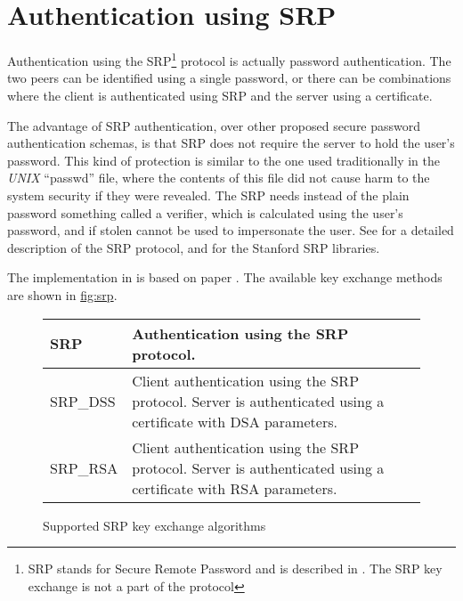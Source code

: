 \section{Authentication using SRP}

Authentication using the SRP\footnote{SRP stands for Secure Remote Password and 
is described in \cite{RFC2945}. The SRP key exchange is not a part of the \tlsI{} protocol}
protocol is actually password authentication. The two peers can be identified using a
single password, or there can be combinations where the client is 
authenticated using SRP and the server using a certificate.
\par
The advantage of SRP authentication, over other proposed secure password 
authentication schemas, is that SRP does not require the server to hold
the user's password. This kind of protection is similar to the one used traditionally
in the \emph{UNIX} ``passwd'' file, where the contents of this file did not cause
harm to the system security if they were revealed.
The SRP needs instead of the plain password something called a verifier, 
which is calculated using the user's password, and if stolen cannot
be used to impersonate the user. See \cite{TOMSRP} for a detailed description
of the SRP protocol, and for the Stanford SRP libraries.

\par
The implementation in \gnutls{} is based on paper \cite{TLSSRP}.
The available key exchange methods are shown in \hyperref{figure}{figure }{}{fig:srp}.

\begin{figure}[hbtp]
\begin{tabular}{|l|p{9cm}|}

\hline
SRP & Authentication using the SRP protocol. 
\\
\hline
SRP\_DSS & Client authentication using the SRP protocol. Server is 
authenticated using a certificate with DSA parameters.
\\
\hline
SRP\_RSA & Client authentication using the SRP protocol. Server is 
authenticated using a certificate with RSA parameters.
\\
\hline
\end{tabular}

\caption{Supported SRP key exchange algorithms}
\label{fig:srp}

\end{figure}

